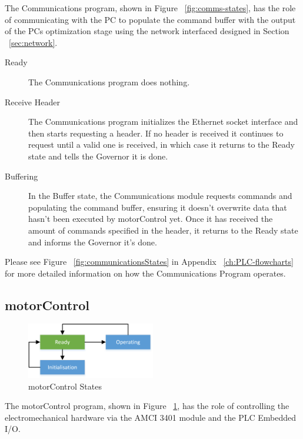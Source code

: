	The Communications program, shown in Figure ~\ref{fig:comms-states}, has the role of communicating with the PC to populate the command buffer with the output of the PCs optimization stage using the network interfaced designed in Section ~\ref{sec:network}.

	
			\begin{description}
				\item[Ready] The Communications program does nothing.
				\item[Receive Header] The Communications program initializes the Ethernet socket interface and then starts requesting a header. If no header is received it continues to request until a valid one is received, in which case it returns to the Ready state and tells the Governor it is done.
				\item[Buffering] In the Buffer state, the Communications module requests commands and populating the command buffer, ensuring it doesn't overwrite data that hasn't been executed by motorControl yet. Once it has received the amount of commands specified in the header, it returns to the Ready state and informs the Governor it's done.
			\end{description}
			
		Please see Figure ~\ref{fig:communicationsStates} in Appendix ~\ref{ch:PLC-flowcharts} for more detailed information on how the Communications Program operates.


\subsection{motorControl}

			\begin{figure}[h]
				\centering
				\includegraphics[width=0.5\textwidth]{figures/cncMachine/motorControl_simple.png}
				\caption{motorControl States}
				\label{fig:motorcontrol-states}
			\end{figure}
	
	The motorControl program, shown in Figure ~\ref{fig:motorcontrol-states}, has the role of controlling the electromechanical hardware via the AMCI 3401 module and the PLC Embedded I/O. 
	

